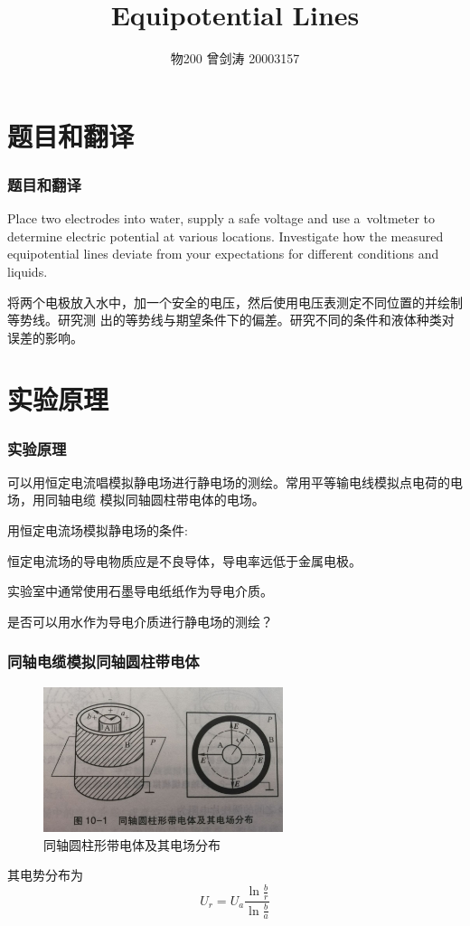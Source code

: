 \documentclass{beamer}
\title{Equipotential Lines}
\author{物200 曾剑涛 20003157}
\date{}
\begin{document}
    \maketitle


    \section{题目和翻译}
    \begin{frame}
        \frametitle{题目和翻译}

        Place two electrodes into water, supply a safe voltage and use a voltmeter to 
        determine electric potential at various locations. Investigate how the measured
         equipotential lines deviate from your expectations for different conditions
          and liquids.

        将两个电极放入水中，加一个安全的电压，然后使用电压表测定不同位置的并绘制等势线。研究测
        出的等势线与期望条件下的偏差。研究不同的条件和液体种类对误差的影响。
    \end{frame}

    \section{实验原理}
    \begin{frame}
        \frametitle{实验原理}
        可以用恒定电流唱模拟静电场进行静电场的测绘。常用平等输电线模拟点电荷的电场，用同轴电缆
        模拟同轴圆柱带电体的电场。
        
        用恒定电流场模拟静电场的条件:

        恒定电流场的导电物质应是不良导体，导电率远低于金属电极。

        实验室中通常使用石墨导电纸纸作为导电介质。
        
        是否可以用水作为导电介质进行静电场的测绘？
    
    \end{frame}

    \begin{frame}
        \frametitle{同轴电缆模拟同轴圆柱带电体}
        \begin{figure}
            \centering
            \includegraphics[width=7cm]{同轴圆柱带电体}
            \caption{同轴圆柱形带电体及其电场分布}
        \end{figure}
        其电势分布为$$ U_r = U_a \frac{\ln \frac{b}{r}}{ \ln \frac{b}{a}{} } $$
        
    
    \end{frame}
\end{document}
